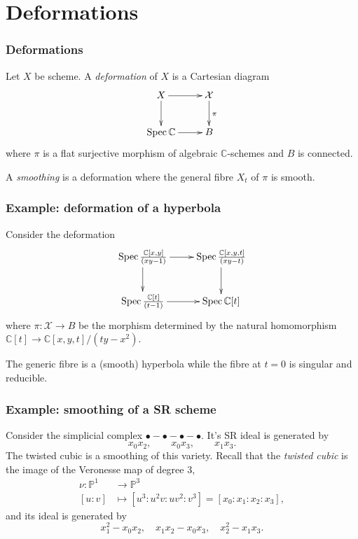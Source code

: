 \documentclass{beamer}
\begin{document}
\section{Deformations}
\label{section-deformations}

\begin{frame}%
\frametitle{Deformations}
Let $X$ be scheme.
A {\it deformation} of $X$ is a Cartesian diagram 
$$
\xymatrix{
X\ar[r]\ar[d]&\mathcal{X}\ar[d]^{\pi}\\
\Spec \mathbb{C}\ar[r]&B
}
$$
where $\pi$ is a flat surjective morphism of algebraic $\mathbb{C}$-schemes and
$B$ is connected.

\medskip\noindent
A {\it smoothing} is a deformation where the general fibre $X_t$ 
of $\pi$ is smooth.
\end{frame}

\begin{frame}%
\frametitle{Example: deformation of a hyperbola}
Consider the deformation
$$
\xymatrix{
\Spec\frac{\mathbb{C}[x,y]}{(xy-1)}\ar[r]\ar[d]
&\Spec\frac{\mathbb{C}[x,y,t]}{(xy-t)}\ar[d]\\
\Spec\frac{\mathbb{C}[t]}{(t-1)}\ar[r]
&\Spec \mathbb{C}[t]
}
$$
where $\pi:\mathcal{X} \to B$ be the morphism
determined by the natural homomorphism
$\mathbb{C}[t] \to \mathbb{C}[x,y,t]/(ty-x^2)$.

\medskip\noindent
The generic fibre is a (smooth) hyperbola 
while the fibre at $t=0$ is singular and reducible.
\end{frame}

\begin{frame}%
\frametitle{Example: smoothing of a SR scheme}

Consider the
simplicial complex $\bullet-\bullet-\bullet-\bullet$.
It's SR ideal is generated by
$$
x_0x_2,\qquad x_0x_3,\qquad x_1x_3.
$$
The twisted cubic is a smoothing of this variety.
Recall that the {\it twisted cubic} is the image 
of the Veronesse map of degree 3,
\begin{align*}
\nu: \mathbb{P}^1 &\longrightarrow \mathbb{P}^3 \\
[u:v] &\longmapsto [u^3:u^2v:uv^2:v^3]=[x_0:x_1:x_2:x_3],
\end{align*}
and its ideal is generated by
$$
x_1^2-x_0x_2,\quad x_1x_2-x_0x_3,\quad x_2^2-x_1x_3.
$$
\end{frame}
\end{document}
